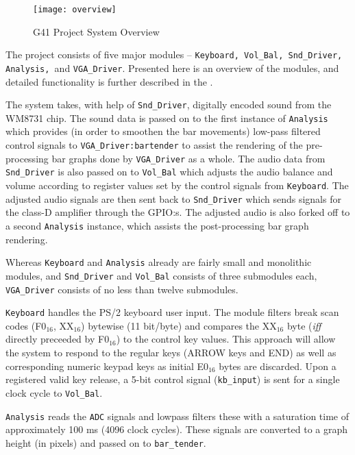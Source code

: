 \begin{figure}[H]
  \centering
  \texttt{[image: overview]}
  \caption{G41 Project System Overview}
  \label{fig:overview}
\end{figure}

The project consists of five major modules -- \texttt{Keyboard, Vol\_Bal, Snd\_Driver, Analysis, }and \texttt{VGA\_Driver}. Presented here is an overview of the modules, and detailed functionality is further described in the \citeD.

The system takes, with help of \texttt{Snd\_Driver}, digitally encoded sound from the WM8731 chip. The sound data is passed on to the first instance of \texttt{Analysis} which provides (in order to smoothen the bar movements) low-pass filtered control signals to \texttt{VGA\_Driver:bartender} to assist the rendering of the pre-processing bar graphs done by \texttt{VGA\_Driver} as a whole. The audio data from \texttt{Snd\_Driver} is also passed on to \texttt{Vol\_Bal} which adjusts the audio balance and volume according to register values set by the control signals from \texttt{Keyboard}. The adjusted audio signals are then sent back to \texttt{Snd\_Driver} which sends signals for the class-D amplifier through the GPIO:s. The adjusted audio is also forked off to a second \texttt{Analysis} instance, which assists the post-processing bar graph rendering.

Whereas \texttt{Keyboard} and \texttt{Analysis} already are fairly small and monolithic modules, and \texttt{Snd\_Driver} and \texttt{Vol\_Bal} consists of three submodules each, \texttt{VGA\_Driver} consists of no less than twelve submodules.

\texttt{Keyboard} handles the PS/2 keyboard user input. The module filters break scan codes (F0$_{16}$, XX$_{16}$) bytewise (11 bit/byte) and compares the XX$_{16}$ byte (\emph{iff} directly preceeded by F0$_{16}$) to the control key values. This approach will allow the system to respond to the regular keys (ARROW keys and END) as well as corresponding numeric keypad keys as initial E0$_{16}$ bytes are discarded. Upon a registered valid key release, a 5-bit control signal (\verb=kb_input=) is sent for a single clock cycle to \texttt{Vol\_Bal}.

\texttt{Analysis} reads the \verb=ADC= signals and lowpass filters these with a saturation time of approximately 100 ms (4096 clock cycles). These signals are converted to a graph height (in pixels) and passed on to \verb=bar_tender=.

